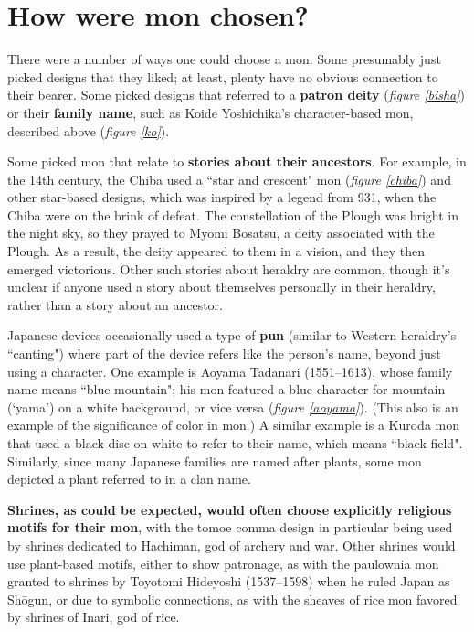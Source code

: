 \documentclass{article}
\newcounter{fig}
\begin{document}
\section{How were mon chosen?}

  There were a number of ways one could choose a mon.  Some presumably
  just picked designs that they liked; at least, plenty have no
  obvious connection to their bearer.  Some picked designs that
  referred to a \textbf{patron deity} (\emph{figure \ref{bisha}}) or their
  \textbf{family name}, such as Koide Yoshichika's character-based mon,
  described above (\emph{figure \ref{ko}}).

  Some picked mon that relate to \textbf{stories about their ancestors}.
  For example, in the 14th century, the Chiba used a ``star and
  crescent" mon (\emph{figure \ref{chiba}}) and other star-based designs,
  which was inspired by a legend from 931, when the Chiba were on the
  brink of defeat.  The constellation of the Plough was bright in the
  night sky, so they prayed to Myomi Bosatsu, a deity associated with
  the Plough.  As a result, the deity appeared to them in a vision,
  and they then emerged victorious. Other such
  stories about heraldry are common, though it's unclear if anyone
  used a story about themselves personally in their heraldry, rather
  than a story about an ancestor.

  Japanese devices occasionally used a type of \textbf{pun} (similar to
  Western heraldry's ``canting") where part of the device refers like
  the person's name, beyond just using a character.  One example is Aoyama
  Tadanari (1551--1613), whose family name means ``blue mountain"; his
  mon featured a blue character for mountain (`yama') on a white
  background, or vice versa (\emph{figure
  \ref{aoyama}}). (This
  also is an example of the significance of color in mon.)  A
  similar example is a Kuroda mon that used a black disc on white to
  refer to their name, which means ``black field".
   Similarly, since many Japanese families are named after
  plants, some mon depicted a plant referred to in a clan
  name.

  \textbf{Shrines, as could be expected, would often choose explicitly
  religious motifs for their mon}, with the tomoe comma design in
  particular being used by shrines dedicated to Hachiman, god of
  archery and war.  Other shrines would use plant-based motifs, either
  to show patronage, as with the paulownia mon granted to shrines by
  Toyotomi Hideyoshi (1537--1598) when he ruled Japan as Sh\=ogun, or
  due to symbolic connections, as with the sheaves of rice mon favored
  by shrines of Inari, god of rice.
\end{document}
